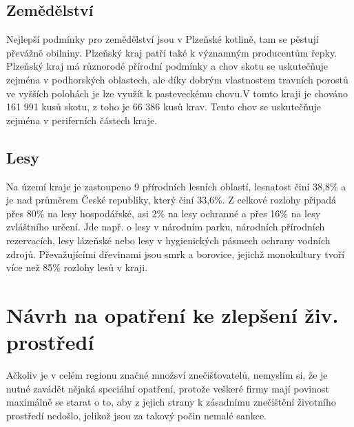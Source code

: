 \documentclass[12pt]{article} %
\begin{document}
\subsection{Zemědělství}
Nejlepší podmínky pro zemědělství jsou v Plzeňské kotlině, tam se pěstují převážně obilniny. Plzeňský kraj patří také k významným producentům řepky. Plzeňský kraj má různorodé přírodní podmínky a chov skotu se uskutečňuje zejména v podhorských oblastech, ale díky dobrým vlastnostem travních porostů ve vyšších polohách je lze využít k pasteveckému chovu.V tomto kraji je chováno 161 991 kusů skotu, z toho je 66 386 kusů krav. Tento chov se uskutečňuje zejména v periferních částech kraje.

\subsection{Lesy}
Na území kraje je zastoupeno 9 přírodních lesních oblastí, lesnatost činí 38,8\% a je nad průměrem České republiky, který činí 33,6\%. Z celkové rozlohy připadá přes 80\% na lesy hospodářské, asi 2\% na lesy ochranné a přes 16\% na lesy zvláštního určení. Jde např. o lesy v národním parku, národních přírodních rezervacích, lesy lázeňské nebo lesy v hygienických pásmech ochrany vodních zdrojů. Převažujícími dřevinami jsou smrk a borovice, jejichž monokultury tvoří více než 85\% rozlohy lesů v kraji.

\section{Návrh na opatření ke zlepšení živ. prostředí}
Ačkoliv je v celém regionu značné množsví znečišťovatelů, nemyslím si, že je nutné zavádět nějaká speciální opatření, protože veškeré firmy mají povinost maximálně se starat o to, aby z jejich strany k zásadnímu znečištění životního prostředí nedošlo, jelikož jsou za takový počin nemalé sankce.
\end{document}
